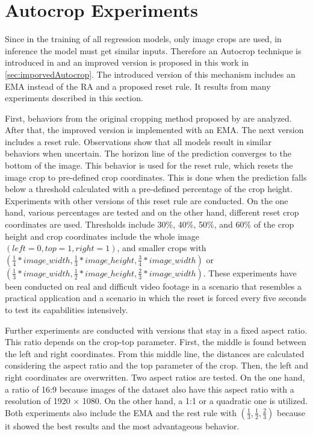 \section{Autocrop Experiments}

Since in the training of all regression models, only image crops are used, in inference the model must get similar inputs.
Therefore an Autocrop technique is introduced in \cite{tepNet2024} and an improved version is proposed in this work in \autoref{sec:imporvedAutocrop}.
The introduced version of this mechanism includes an \ac{EMA} instead of the \ac{RA} and a proposed reset rule.
It results from many experiments described in this section.

First, behaviors from the original cropping method proposed by \cite{tepNet2024} are analyzed.
After that, the improved version is implemented with an \ac{EMA}.
The next version includes a reset rule.
Observations show that all models result in similar behaviors when uncertain.
The horizon line of the prediction converges to the bottom of the image.
This behavior is used for the reset rule, which resets the image crop to pre-defined crop coordinates.
This is done when the prediction falls below a threshold calculated with a pre-defined percentage of the crop height.
Experiments with other versions of this reset rule are conducted.
On the one hand, various percentages are tested and on the other hand, different reset crop coordinates are used.
Thresholds include 30\%, 40\%, 50\%, and 60\% of the crop height and crop coordinates include the whole image $(left=0, top=1, right=1)$, and smaller crops with $(\frac{1}{4}*image\_width, \frac{1}{3}*image\_height, \frac{3}{4}*image\_width)$ or $(\frac{1}{3}*image\_width, \frac{1}{2}*image\_height, \frac{2}{3}*image\_width)$.
These experiments have been conducted on real and difficult video footage in a scenario that resembles a practical application and a scenario in which the reset is forced every five seconds to test its capabilities intensively.

Further experiments are conducted with versions that stay in a fixed aspect ratio.
This ratio depends on the crop-top parameter.
First, the middle is found between the left and right coordinates.
From this middle line, the distances are calculated considering the aspect ratio and the top parameter of the crop.
Then, the left and right coordinates are overwritten.
Two aspect ratios are tested.
On the one hand, a ratio of 16:9 because images of the dataset also have this aspect ratio with a resolution of 1920 $\times$ 1080.
On the other hand, a 1:1 or a quadratic one is utilized.
Both experiments also include the \ac{EMA} and the rest rule with $(\frac{1}{3}, \frac{1}{2}, \frac{2}{3})$ because it showed the best results and the most advantageous behavior.

